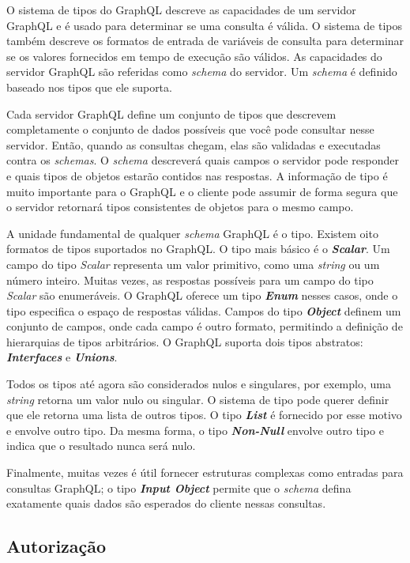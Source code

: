O sistema de tipos do GraphQL descreve as capacidades de um servidor GraphQL e é usado para determinar se uma consulta é válida. O sistema de tipos também descreve os formatos de entrada de variáveis de consulta para determinar se os valores fornecidos em tempo de execução são válidos. As capacidades do servidor GraphQL são referidas como \textit{schema} do servidor. Um \textit{schema} é definido baseado nos tipos que ele suporta.

Cada servidor GraphQL define um conjunto de tipos que descrevem completamente o conjunto de dados possíveis que você pode consultar nesse servidor. Então, quando as consultas chegam, elas são validadas e executadas contra os \textit{schemas}. O \textit{schema} descreverá quais campos o servidor pode responder e quais tipos de objetos estarão contidos nas respostas. A informação de tipo é muito importante para o GraphQL e o cliente pode assumir de forma segura que o servidor retornará tipos consistentes de objetos para o mesmo campo.

A unidade fundamental de qualquer \textit{schema} GraphQL é o tipo. Existem oito formatos de tipos suportados no GraphQL. O tipo mais básico é o \textit{\textbf{Scalar}}. Um campo do tipo \textit{Scalar} representa um valor primitivo, como uma \textit{string} ou um número inteiro. Muitas vezes, as respostas possíveis para um campo  do tipo \textit{Scalar} são enumeráveis. O GraphQL oferece um tipo \textit{\textbf{Enum}} nesses casos, onde o tipo especifica o espaço de respostas válidas. Campos do tipo \textit{\textbf{Object}} definem um conjunto de campos, onde cada campo é outro formato, permitindo a definição de hierarquias de tipos arbitrários. O GraphQL suporta dois tipos abstratos:  \textit{\textbf{Interfaces}} e  \textit{\textbf{Unions}}.

Todos os tipos até agora são considerados nulos e singulares, por exemplo,  uma \textit{string} retorna um valor nulo ou singular. O sistema de tipo pode querer definir que ele retorna uma lista de outros tipos. O tipo \textit{\textbf{List}} é fornecido por esse motivo e envolve outro tipo. Da mesma forma, o tipo \textit{\textbf{Non-Null}} envolve outro tipo e indica que o resultado nunca será nulo.

Finalmente, muitas vezes é útil fornecer estruturas complexas como entradas para consultas GraphQL; o tipo \textit{\textbf{Input Object}} permite que o \textit{schema} defina exatamente quais dados são esperados do cliente nessas consultas.


\subsection{Autorização}

